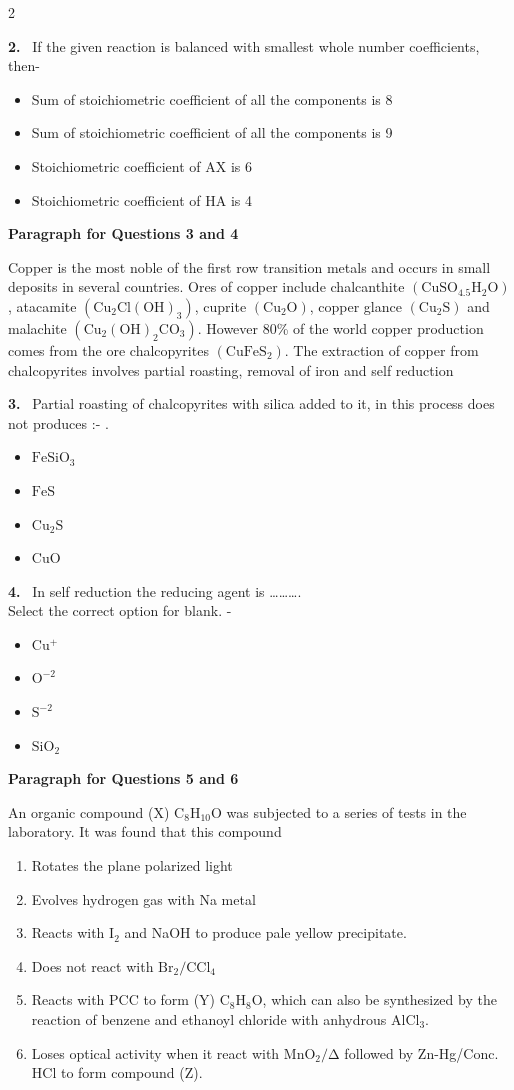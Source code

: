 \documentclass[10pt]{extarticle}
\newcommand{\qn}[1]{\par\smallskip\noindent\textbf{#1.}~}
\newcommand{\paraq}[2]{\par\smallskip\noindent\textbf{Paragraph for Questions #1 and #2}\par}
\newenvironment{qoptions}{\begin{itemize}[leftmargin=1.8em,itemsep=1pt,topsep=2pt,label={}]}{\end{itemize}}
\newcommand{\opt}[2]{\item[(#1)] #2}
\begin{document}
\begin{multicols}{2}
\begin{qoptions}
\end{qoptions}
\qn{2} If the given reaction is balanced with smallest whole number coefficients, then-
\begin{qoptions}
\opt{A}{Sum of stoichiometric coefficient of all the components is 8}
\opt{B}{Sum of stoichiometric coefficient of all the components is 9}
\opt{C}{Stoichiometric coefficient of AX is 6}
\opt{D}{Stoichiometric coefficient of HA is 4}
\end{qoptions}
\paraq{3}{4}
Copper is the most noble of the first row transition metals and occurs in small deposits in several countries. Ores of copper include chalcanthite $\mathrm{(CuSO_4.5H_2O)}$, atacamite $\mathrm{(Cu_2Cl(OH)_3)}$, cuprite $\mathrm{(Cu_2O)}$, copper glance $\mathrm{(Cu_2S)}$ and malachite $\mathrm{(Cu_2(OH)_2CO_3)}$. However 80\% of the world copper production comes from the ore chalcopyrites $\mathrm{(CuFeS_2)}$. The extraction of copper from chalcopyrites involves partial roasting, removal of iron and self reduction
\qn{3} Partial roasting of chalcopyrites with silica added to it, in this process does not produces :- .
\begin{qoptions}
\opt{A}{$\mathrm{FeSiO_3}$}
\opt{B}{$\mathrm{FeS}$}
\opt{C}{$\mathrm{Cu_2S}$}
\opt{D}{$\mathrm{CuO}$}
\end{qoptions}
\qn{4} In self reduction the reducing agent is \ldots\ldots\ldots .\\
Select the correct option for blank. -
\begin{qoptions}
\opt{A}{$\mathrm{Cu^+}$}
\opt{B}{$\mathrm{O^{-2}}$}
\opt{C}{$\mathrm{S^{-2}}$}
\opt{D}{$\mathrm{SiO_2}$}
\end{qoptions}
\paraq{5}{6}
An organic compound (X) $\mathrm{C_8H_{10}O}$ was subjected to a series of tests in the laboratory. It was found that this compound
\begin{enumerate}[label=(\roman*),leftmargin=2em,itemsep=0pt,topsep=2pt]
\item Rotates the plane polarized light
\item Evolves hydrogen gas with Na metal
\item Reacts with $\mathrm{I_2}$ and NaOH to produce pale yellow precipitate.
\item Does not react with $\mathrm{Br_2/CCl_4}$
\item Reacts with PCC to form (Y) $\mathrm{C_8H_8O}$, which can also be synthesized by the reaction of benzene and ethanoyl chloride with anhydrous $\mathrm{AlCl_3}$.
\item Loses optical activity when it react with $\mathrm{MnO_2/\Delta}$ followed by Zn-Hg/Conc. HCl to form compound (Z).

\end{enumerate}
\end{multicols}
\end{document}
